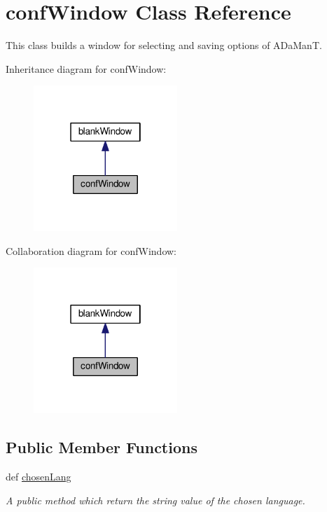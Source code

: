 \hypertarget{classgui_1_1window2_1_1confWindow}{\section{conf\-Window Class Reference}
\label{classgui_1_1window2_1_1confWindow}
}


This class builds a window for selecting and saving options of A\-Da\-Man\-T.  




Inheritance diagram for conf\-Window\-:\nopagebreak
\begin{figure}[H]
\begin{center}
\leavevmode
\includegraphics[width=154pt]{classgui_1_1window2_1_1confWindow__inherit__graph}
\end{center}
\end{figure}


Collaboration diagram for conf\-Window\-:\nopagebreak
\begin{figure}[H]
\begin{center}
\leavevmode
\includegraphics[width=154pt]{classgui_1_1window2_1_1confWindow__coll__graph}
\end{center}
\end{figure}
\subsection*{Public Member Functions}
\begin{DoxyCompactItemize}
\item 
\hypertarget{classgui_1_1window2_1_1confWindow_a2d2bfbe7abc45a786220f7555e52b01c}{def \hyperlink{classgui_1_1window2_1_1confWindow_a2d2bfbe7abc45a786220f7555e52b01c}{chosen\-Lang}}\label{classgui_1_1window2_1_1confWindow_a2d2bfbe7abc45a786220f7555e52b01c}

\begin{DoxyCompactList}\small\item\em A public method which return the string value of the chosen language. \end{DoxyCompactList}\end{DoxyCompactItemize}



